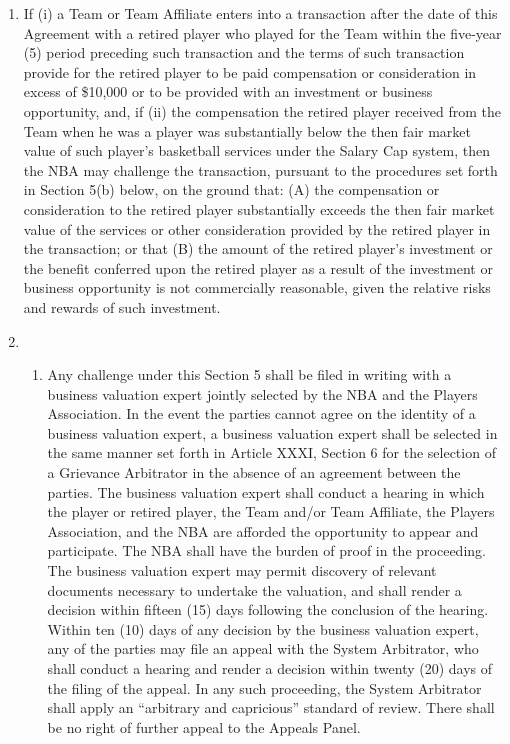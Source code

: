 \documentclass[
]{book}
\providecommand{\tightlist}{%
  \setlength{\itemsep}{0pt}\setlength{\parskip}{0pt}}
\begin{document}
\begin{enumerate}
\def\labelenumi{(\alph{enumi})}
\item
  If (i) a Team or Team Affiliate enters into a transaction after the date of this Agreement with a retired player who played for the Team within the five-year (5) period preceding such transaction and the terms of such transaction provide for the retired player to be paid compensation or consideration in excess of \$10,000 or to be provided with an investment or business opportunity, and, if (ii) the compensation the retired player received from the Team when he was a player was substantially below the then fair market value of such player's basketball services under the Salary Cap system, then the NBA may challenge the transaction, pursuant to the procedures set forth in Section 5(b) below, on the ground that: (A) the compensation or consideration to the retired player substantially exceeds the then fair market value of the services or other consideration provided by the retired player in the transaction; or that (B) the amount of the retired player's investment or the benefit conferred upon the retired player as a result of the investment or business opportunity is not commercially reasonable, given the relative risks and rewards of such investment.
\item
  \begin{enumerate}
  \def\labelenumii{(\roman{enumii})}
  \tightlist
  \item
    Any challenge under this Section 5 shall be filed in writing with a business valuation expert jointly selected by the NBA and the Players Association. In the event the parties cannot agree on the identity of a business valuation expert, a business valuation expert shall be selected in the same manner set forth in Article XXXI, Section 6 for the selection of a Grievance Arbitrator in the absence of an agreement between the parties. The business valuation expert shall conduct a hearing in which the player or retired player, the Team and/or Team Affiliate, the Players Association, and the NBA are afforded the opportunity to appear and participate. The NBA shall have the burden of proof in the proceeding. The business valuation expert may permit discovery of relevant documents necessary to undertake the valuation, and shall render a decision within fifteen (15) days following the conclusion of the hearing. Within ten (10) days of any decision by the business valuation expert, any of the parties may file an appeal with the System Arbitrator, who shall conduct a hearing and render a decision within twenty (20) days of the filing of the appeal. In any such proceeding, the System Arbitrator shall apply an ``arbitrary and capricious'' standard of review. There shall be no right of further appeal to the Appeals Panel.

\end{enumerate}
\end{enumerate}
\end{document}
